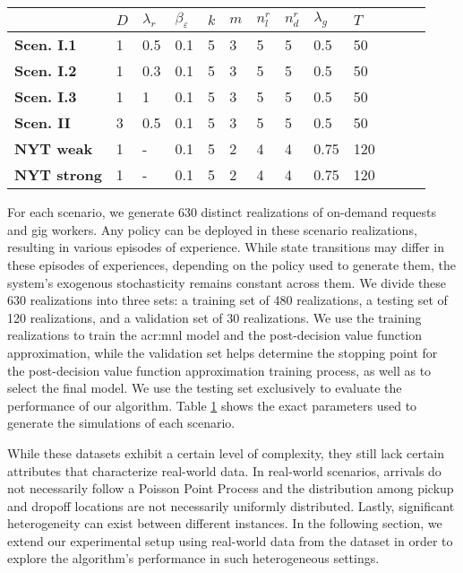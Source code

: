 \begin{table}[b!]
    \centering
    \label{tab:scen_param}
    \begin{tabular}{lllllllllllll}
        \toprule
         & $D$ & $\lambda_r$ & $\beta_{\varepsilon}$ & $k$ & $m$ & $n_l^r$ &  $n_d^r$ & $\lambda_g$ & $T$ \\
        \midrule
        \textbf{Scen. I.1} & 1 & 0.5 & 0.1 & 5 & 3 & 5 & 5 & 0.5  & 50 \\
        \midrule
        \textbf{Scen. I.2} & 1 & 0.3 & 0.1 & 5 & 3 & 5 & 5 & 0.5  & 50 \\
        \midrule
        \textbf{Scen. I.3} & 1 & 1 & 0.1 & 5 & 3 & 5 & 5 & 0.5  & 50 \\
        \midrule
        \textbf{Scen. II} & 3 & 0.5 & 0.1 & 5 & 3 & 5 & 5 & 0.5  & 50 \\
        \midrule
        \textbf{NYT weak} & 1 & - & 0.1 & 5 & 2 & 4 & 4 & 0.75 & 120 \\
        \midrule
        \textbf{NYT strong} & 1 & - & 0.1 & 5 & 2 & 4 & 4 & 0.75 & 120 \\
        \bottomrule
    \end{tabular}
\end{table}

For each scenario, we generate 630 distinct realizations of on-demand requests and gig workers. Any policy can be deployed in these scenario realizations, resulting in various episodes of experience. While state transitions may differ in these episodes of experiences, depending on the policy used to generate them, the system's exogenous stochasticity remains constant across them. We divide these 630 realizations into three sets: a training set of 480 realizations, a testing set of 120 realizations, and a validation set of 30 realizations. We use the training realizations to train the \gls{acr:mnl} model and the post-decision value function approximation, while the validation set helps determine the stopping point for the post-decision value function approximation training process, as well as to select the final model. We use the testing set exclusively to evaluate the performance of our algorithm. Table \ref{tab:scen_param} shows the exact parameters used to generate the simulations of each scenario. 

While these datasets exhibit a certain level of complexity, they still lack certain attributes that characterize real-world data. In real-world scenarios, arrivals do not necessarily follow a Poisson Point Process and the distribution among pickup and dropoff locations are not necessarily uniformly distributed. Lastly, significant heterogeneity can exist between different instances. In the following section, we extend our experimental setup using real-world data from the \cite{NYTdata} dataset in order to explore the algorithm’s performance in such heterogeneous settings.

